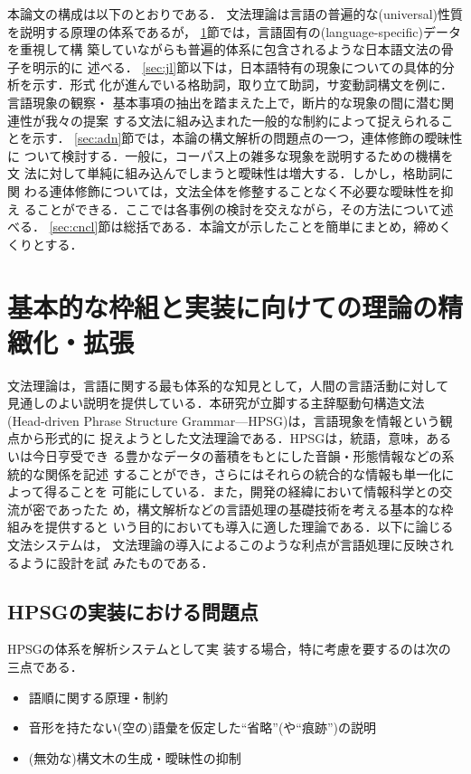 本論文の構成は以下のとおりである．
文法理論は言語の普遍的な(universal)性質を説明する原理の体系であるが，
\ref{sec:jpsg}節では，言語固有の(language-specific)データを重視して構
築していながらも普遍的体系に包含されるような日本語文法の骨子を明示的に
述べる．
\ref{sec:jl}節以下は，日本語特有の現象についての具体的分析を示す．形式
化が進んでいる格助詞，取り立て助詞，サ変動詞構文を例に．言語現象の観察・
基本事項の抽出を踏まえた上で，断片的な現象の間に潜む関連性が我々の提案
する文法に組み込まれた一般的な制約によって捉えられることを示す．
\ref{sec:adn}節では，本論の構文解析の問題点の一つ，連体修飾の曖昧性に
ついて検討する．一般に，コーパス上の雑多な現象を説明するための機構を文
法に対して単純に組み込んでしまうと曖昧性は増大する．しかし，格助詞に関
わる連体修飾については，文法全体を修整することなく不必要な曖昧性を抑え
ることができる．ここでは各事例の検討を交えながら，その方法について述べる．
\ref{sec:cncl}節は総括である．本論文が示したことを簡単にまとめ，締めく
くりとする．

\setcounter{section}{1}

\section{基本的な枠組と実装に向けての理論の精緻化・拡張}\label{sec:jpsg}

文法理論は，言語に関する最も体系的な知見として，人間の言語活動に対して
見通しのよい説明を提供している．本研究が立脚する主辞駆動句構造文法
(Head-driven Phrase Structure Grammar---HPSG)\cite{Pollard&Sag1987,
Pollard&Sag1994,Sag&Wasow1999}は，言語現象を情報という観点から形式的に
捉えようとした文法理論である．HPSGは，統語，意味，あるいは今日亨受でき
る豊かなデータの蓄積をもとにした音韻・形態情報などの系統的な関係を記述
することができ，さらにはそれらの統合的な情報も単一化によって得ることを
可能にしている．また，開発の経緯において情報科学との交流が密であったた
め，構文解析などの言語処理の基礎技術を考える基本的な枠組みを提供すると
いう目的においても導入に適した理論である．以下に論じる文法システムは，
文法理論の導入によるこのような利点が言語処理に反映されるように設計を試
みたものである．

\subsection{HPSGの実装における問題点}\label{sec:jpsg:issue}
HPSGの体系\cite{Pollard&Sag1987,Pollard&Sag1994}を解析システムとして実
装する場合，特に考慮を要するのは次の三点である．
\begin{itemize}
\item [1.] 語順に関する原理・制約
\item [2.] 音形を持たない(空の)語彙を仮定した``省略''(や``痕跡'')の説明
\item [3.] (無効な)構文木の生成・曖昧性の抑制
\end{itemize}

